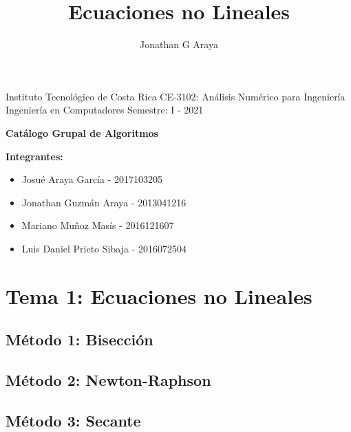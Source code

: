 \documentclass[10pt,a4paper]{article}
\author{Jonathan G Araya}
\title{Ecuaciones no Lineales}
\begin{document}
	Instituto Tecnológico de Costa Rica \hfill CE-3102: Análisis Numérico para Ingeniería\\
	Ingeniería en Computadores \hfill Semestre: I - 2021\\
	
	\begin{center}
		\textbf{\huge Catálogo Grupal de Algoritmos}
	\end{center}
	
	{\bf Integrantes: }
	\begin{itemize}
		\item Josué Araya García - 2017103205
		\item Jonathan Guzmán Araya - 2013041216
		\item Mariano Muñoz Masís - 2016121607
		\item Luis Daniel Prieto Sibaja - 2016072504
	\end{itemize}

	\tableofcontents
	
	\section{Tema 1: Ecuaciones no Lineales}
	
		\subsection{Método 1: Bisección}
	
		
	
		\subsection{Método 2: Newton-Raphson}
		
		
	
		\subsection{Método 3: Secante}
	
		
		
\end{document}

